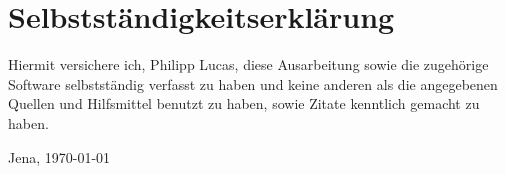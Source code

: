\section*{Selbstständigkeitserklärung}

Hiermit versichere ich, Philipp Lucas, diese Ausarbeitung sowie die zugehörige Software selbstständig verfasst zu haben und keine anderen als die angegebenen Quellen und Hilfsmittel benutzt zu haben, sowie Zitate kenntlich gemacht zu haben. \par
\vspace{1cm}
\hfill Jena, \today \\
